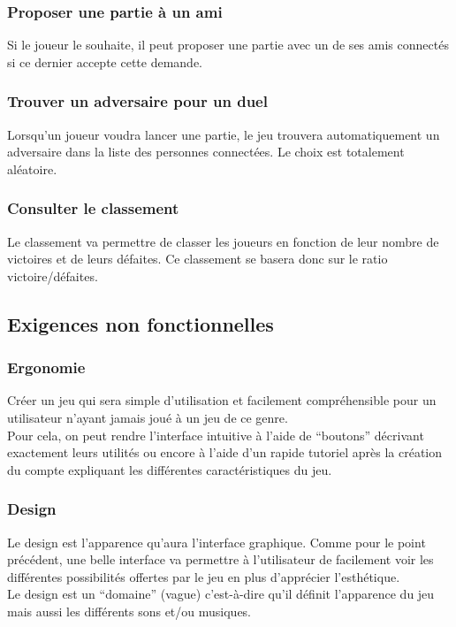\documentclass[11pt,a4paper]{article}
\begin{document}
\subsubsection{Proposer une partie à un ami}

Si le joueur le souhaite, il peut proposer une partie avec un de ses
amis connectés si ce dernier accepte cette demande.

\subsubsection{Trouver un adversaire pour un duel}

Lorsqu'un joueur voudra lancer une partie, le jeu trouvera
automatiquement un adversaire dans la liste des personnes
connectées.  Le choix est totalement aléatoire.

\subsubsection{Consulter le classement}

Le classement va permettre de classer les joueurs en fonction de
leur nombre de victoires et de leurs défaites. Ce classement se
basera donc sur le ratio victoire/défaites.


\subsection{Exigences non fonctionnelles}
\label{sec:exi-nonfonc}

\subsubsection{Ergonomie}
Créer un jeu qui sera simple d'utilisation et facilement compréhensible pour un utilisateur n'ayant jamais joué à un jeu de ce genre.\\
Pour cela, on peut rendre l'interface intuitive à l'aide de ``boutons'' décrivant exactement leurs utilités ou encore à l'aide d'un rapide tutoriel après la création du compte expliquant les différentes caractéristiques du jeu.

\subsubsection{Design}
Le design est l'apparence qu'aura l'interface graphique. Comme pour le point précédent, une belle interface va permettre à l'utilisateur de facilement voir les différentes possibilités offertes par le jeu en plus d'apprécier l’esthétique.\\
Le design est un ``domaine'' (vague) c'est-à-dire qu'il définit l'apparence du jeu mais aussi les différents sons et/ou musiques.
\end{document}
